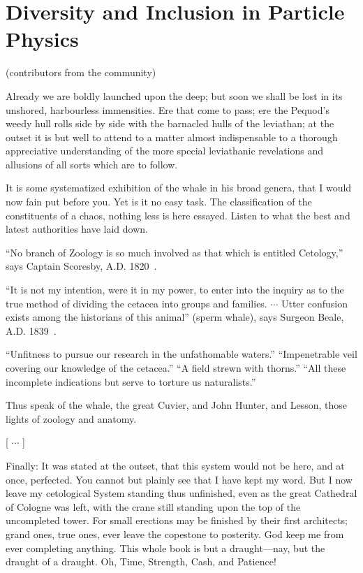 
\setcounter{chapter}{2} 


\chapter{Diversity and Inclusion in Particle Physics}

   {(contributors from the community)}


Already we are boldly launched upon the deep; but soon we shall be lost in its unshored, harbourless immensities. Ere that come to pass; ere the Pequod’s weedy hull rolls side by side with the barnacled hulls of the leviathan; at the outset it is but well to attend to a matter almost indispensable to a thorough appreciative understanding of the more special leviathanic revelations and allusions of all sorts which are to follow.

It is some systematized exhibition of the whale in his broad genera, that I would now fain put before you. Yet is it no easy task. The classification of the constituents of a chaos, nothing less is here essayed. Listen to what the best and latest authorities have laid down.

``No branch of Zoology is so much involved as that which is entitled Cetology,'' says Captain Scoresby, A.D. 1820~\cite{Comm3-Scoresby}.

``It is not my intention, were it in my power, to enter into the inquiry as to the true method of dividing the cetacea into groups and families. $\cdots$ Utter confusion exists among the historians of this animal'' (sperm whale), says Surgeon Beale, A.D. 1839~\cite{Comm3-Beale}.

``Unfitness to pursue our research in the unfathomable waters.'' ``Impenetrable veil covering our knowledge of the cetacea.''  ``A field strewn with thorns.'' ``All these incomplete indications but serve to torture us naturalists.''

Thus speak of the whale, the great Cuvier, and John Hunter, and Lesson, those lights of zoology and anatomy.

[ $\cdots$ ]

Finally: It was stated at the outset, that this system would not be here, and at once, perfected. You cannot but plainly see that I have kept my word. But I now leave my cetological System standing thus unfinished, even as the great Cathedral of Cologne was left, with the crane still standing upon the top of the uncompleted tower. For small erections may be finished by their first architects; grand ones, true ones, ever leave the copestone to posterity. God keep me from ever completing anything. This whole book is but a draught---nay, but the draught of a draught. Oh, Time, Strength, Cash, and Patience!


